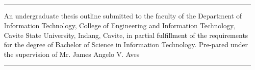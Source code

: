 \begin{center}
	\Large
	\textbf{\thesistitle{}}

	\leavevmode\\
	\leavevmode\\

	\thesisautors{}

	\leavevmode\\
	\leavevmode\\

	\hrule
	\parbox{\textwidth}{
	\justify
	An undergraduate thesis outline submitted to the faculty of the Department of Information
	Technology, College of Engineering and Information Technology, Cavite State University,
	Indang, Cavite, in partial fulfillment of the requirements for the degree of Bachelor of
	Science in Information Technology. Pre-pared under the supervision of Mr. James Angelo V. Aves}
	\hrule

	\leavevmode\\
	\leavevmode\\
\end{center}
